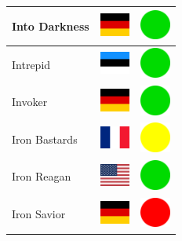 \documentclass[12pt, a4paper, twoside]{report}
\begin{document}
\begin{center}
\begin{longtable}{|p{5cm}|p{2cm}|p{2cm}|}
 Into Darkness                                              & \includegraphics[width=1cm]{../4x3/de} &   \includegraphics[width=1cm]{../likes/y} \\ \hline
 Intrepid                                                   & \includegraphics[width=1cm]{../4x3/ee} &   \includegraphics[width=1cm]{../likes/y} \\ \hline
 Invoker                                                    & \includegraphics[width=1cm]{../4x3/de} &   \includegraphics[width=1cm]{../likes/y} \\ \hline
 Iron Bastards                                              & \includegraphics[width=1cm]{../4x3/fr} &   \includegraphics[width=1cm]{../likes/m} \\ \hline
 Iron Reagan                                                & \includegraphics[width=1cm]{../4x3/us} &   \includegraphics[width=1cm]{../likes/y} \\ \hline
 Iron Savior                                                & \includegraphics[width=1cm]{../4x3/de} &   \includegraphics[width=1cm]{../likes/n} \\ \hline

\end{longtable}
\end{center}
\end{document}
